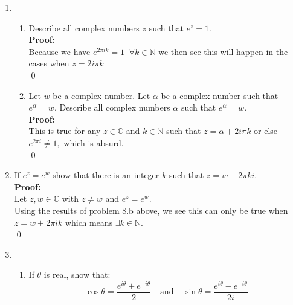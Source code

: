 \begin{enumerate}
	\item
	\begin{enumerate}
		\item Describe all complex numbers $z$ such that $e^z = 1.$ \\
		
		\textbf{Proof:} \\
		Because we have $e^{2\pi i k} = 1 \;\; \forall k \in \mathbb{N}$ we then see this will happen in the cases when $ z = 2 i \pi k$ \\
		\qed


		\item Let $w$ be a complex number. Let $\alpha$ be a complex number such that $e^{\alpha} = w.$ Describe all complex numbers $\alpha$ such that $e^\alpha = w.$ \\
		
		\textbf{Proof:} \\
		This is true for any $z \in \mathbb{C}$ and $k \in \mathbb{N}$ such that $z = \alpha + 2i \pi k$ or else $e^{2\pi i} \neq 1,$ which is absurd. \\
		\qed
	\end{enumerate} 


	\item If $e^z = e^w$ show that there is an integer $k$ such that $z = w + 2\pi k i.$ \\
	
	\textbf{Proof:} \\
	Let $z, w \in \mathbb{C}$ with $z \neq w$ and $e^z = e^w.$ \\
	
	Using the results of problem 8.b above, we see this can only be true when $z = w + 2\pi i k$ which means $\exists k \in \mathbb{N}.$ \\
	\qed
	

	\item 
	\begin{enumerate}

		\item If $\theta$ is real, show that:
		\[\cos{\theta} = \frac{e^{i\theta} + e^{-i\theta}}{2} \;\;\;\ \text{and} \;\;\;\; \sin{\theta} = {\frac{e^{i\theta} - e^{-i\theta}}{2i}}\] \\
		

\end{enumerate}
\end{enumerate}
